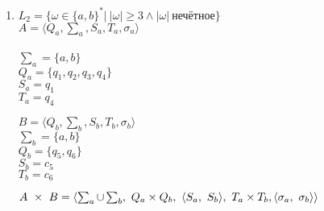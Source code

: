 \documentclass{article}
\begin{document}
\begin{enumerate}
\begin{tabular}{ | l | l | l | }
            \end{tabular} \\
            
            \begin{center}
            \end{center}
            
            \LARGE
            \item \( L_2 = \{ \omega \in \{a,b\}^*| \ |\omega| \geq 3 \land |\omega| \  \text{нечётное} \}\) \\
            
            \(A = \langle{Q_a, \sum_a, S_a, T_a, \sigma_a}\rangle\) \\
            \\
            \hspace*{-20mm}\(\sum_a = \{ a,b \}\) \\
            \hspace*{-20mm}\(Q_a = \{ q_1, q_2, q_3, q_4 \}\) \\
            \hspace*{-20mm}\(S_a = q_1\) \\
            \hspace*{-20mm}\(T_a = q_4\) \\
            
            \begin{center}
            \end{center}
            
            \(B = \langle{Q_b, \sum_b, S_b, T_b, \sigma_b}\rangle\) \\

            \hspace*{-20mm}\(\sum_b = \{ a,b \}\) \\
            \hspace*{-20mm}\(Q_b = \{ q_5, q_6\} \) \\
            \hspace*{-20mm}\(S_b = c_5\) \\
            \hspace*{-20mm}\(T_b = c_6\) \\

            \begin{center}
            \end{center}
            
            \(A\ \times\  B = \langle{\sum_a\cup\sum_b,\ Q_a\times Q_b,\ \langle S_a,\ S_b\rangle,\ T_a\times T_b,\ \\
            \langle \sigma_a,\ \sigma_b\rangle }\rangle\)\\
            

\end{enumerate}
\end{document}
